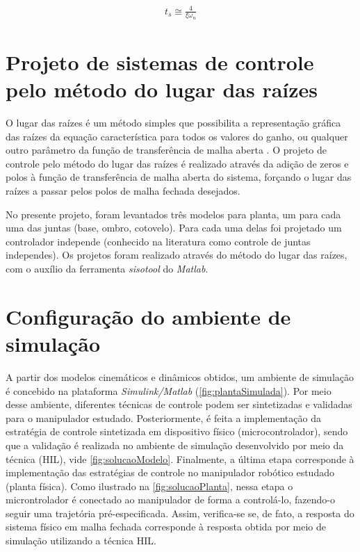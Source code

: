 \begin{equation}
  \begin{gathered}
    t_s \cong \frac{4}{\xi \omega_n}
  \end{gathered}
  \label{eq:tempoAcomodacao}
\end{equation}

\section{Projeto de sistemas de controle pelo método do lugar das raízes}

O lugar das raízes é um método simples que possibilita a representação gráfica das raízes da equação
característica para todos os valores do ganho, ou qualquer outro parâmetro da função de transferência
de malha aberta \cite{Ogata}. O projeto de controle pelo método do lugar das raízes é realizado através 
da adição de zeros e polos à função de transferência de malha aberta do sistema, forçando o lugar das raízes a passar 
pelos polos de malha fechada desejados.

No presente projeto, foram levantados três modelos para planta, um para cada uma das juntas (base, ombro, cotovelo).
Para cada uma delas foi projetado um controlador independe (conhecido na literatura como controle de juntas independes). Os projetos 
foram realizado através do método do lugar das raízes, com o auxílio da ferramenta \textit{sisotool} do \textit{Matlab}.

\section{Configuração do ambiente de simulação}

A partir dos modelos cinemáticos e dinâmicos obtidos, um ambiente de simulação é 
concebido na plataforma \textit{Simulink/Matlab} (\autoref{fig:plantaSimulada}). Por meio desse 
ambiente, diferentes técnicas de controle podem ser sintetizadas e validadas para o manipulador estudado. 
Posteriormente, é feita a implementação da estratégia de controle sintetizada em dispositivo físico (microcontrolador),
sendo que a validação é realizada no ambiente de simulação 
desenvolvido por meio da técnica (HIL), vide 
\autoref{fig:solucaoModelo}. Finalmente, a última etapa corresponde à implementação das 
estratégias de controle no manipulador robótico estudado (planta física). Como ilustrado 
na \autoref{fig:solucaoPlanta}, nessa etapa o microntrolador é conectado ao manipulador de 
forma a controlá-lo, fazendo-o seguir uma trajetória pré-especificada. Assim, verifica-se 
se, de fato, a resposta do sistema físico em malha fechada corresponde à resposta obtida 
por meio de simulação utilizando a técnica HIL.

